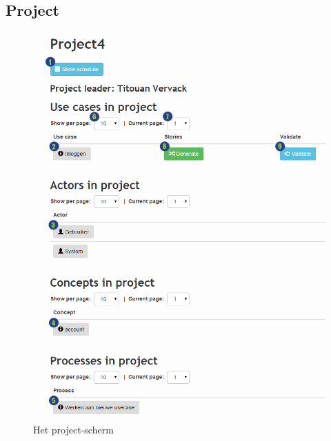 \documentclass[a4paper,11pt]{article}
\begin{document}
\subsection{Project}
\label{sec:teamlid_project}
\begin{figure}[H]
\centering
\includegraphics[scale=0.5]{Gebruikershandleiding_img/project.png}
\caption{Het project-scherm}
\label{fig:teamlid_project}
\end{figure}
\end{document}
